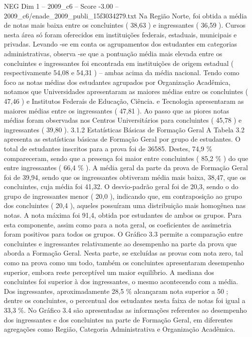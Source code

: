\begin{textsample}{NEG Dim 1 – 2009\_c6 – Score -3.00 – 2009\_c6/enade\_2009\_publi\_15f3034279.txt}
Na Região Norte, foi obtida a média de notas mais baixa entre os concluintes ( 38,63 ) e ingressantes ( 36,59 ).
Cursos nesta área só foram oferecidos em instituições federais, estaduais, municipais e privadas.
Levando -se em conta os agrupamentos dos estudantes em categorias administrativas, observa -se que a pontuação média mais elevada entre os concluintes e ingressantes foi encontrada em instituições de origem estadual ( respectivamente 54,08 e 54,31 ) – ambas acima da média nacional.
Tendo como foco as notas médias dos estudantes agrupados por Organização Acadêmica, notamos que Universidades apresentaram as maiores médias entre os concluintes ( 47,46 ) e Institutos Federais de Educação, Ciência. e Tecnologia apresentaram as maiores médias entre os ingressantes ( 47,81 ).
Ao passo que as piores notas médias foram observadas nos Centros Universitários para concluintes ( 45,78 ) e ingressantes ( 39,80 ). 3.1.2 Estatísticas Básicas de Formação Geral A Tabela 3.2 apresenta as estatísticas básicas de Formação Geral por grupo de estudantes.
O total de estudantes inscritos para a prova foi de 36585.
Destes, 74,9 \% compareceram, sendo que a presença foi maior entre concluintes ( 85,2 \% ) do que entre ingressantes ( 66,4 \% ).
A média geral da parte da prova de Formação Geral foi de 39,94, sendo que os ingressantes obtiveram média mais baixa, 38,47, que os concluintes, cuja média foi 41,32.
O desvio-padrão geral foi de 20,3, sendo o do grupo de ingressantes menor ( 20,0 ), indicando que, em contraposição ao grupo dos concluintes ( 20,4 ), aqueles possuíram uma distribuição mais homogênea nas notas.
A nota máxima foi 91,4, obtida por estudantes de ambos os grupos.
Para esta componente, assim como para a nota geral, os coeficientes de assimetria foram positivos para todos os grupos.
O Gráfico 3.3 permite a comparação entre concluintes e ingressantes relativamente ao desempenho na parte da prova que aborda a Formação Geral.
Nesta parte, se excluídas as provas com nota zero, tal como na prova como um todo, também os concluintes apresentaram desempenho superior, embora reste perceptível um maior equilíbrio.
A mediana dos concluintes foi superior à dos ingressantes, o mesmo acontecendo com a média.
Dos ingressantes, aproximadamente 28,5 \% alcançaram nota superior a 50 ; dentre os concluintes, o percentual dos estudantes nesta faixa de notas foi igual a 33,3 \%.
No Gráfico 3.4 são apresentadas as informações referentes ao desempenho dos ingressantes e dos concluintes na parte de Formação Geral, em diferentes agregações como Região, Categoria Administrativa e Organização Acadêmica.

\end{textsample}
